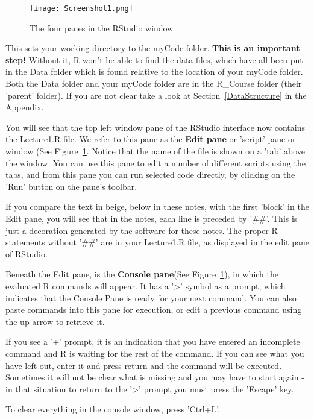 \documentclass[titlepage]{book}
\begin{document}
\begin{figure}[!ht]
\graphicspath{{./Images/}}
\texttt{[image: Screenshot1.png]}
\caption{The four panes in the RStudio window}
\label{fig:Screenshot}
\end{figure}

This sets your working directory to the myCode folder. \textbf{This is an important step!}  Without it, R won't be able to find the data files, which have all been put in the Data folder which is found relative to the location of your myCode folder. Both the Data folder and your myCode folder are in the R\_Course folder (their 'parent' folder). If you are not clear take a look at Section~\ref{DataStructure} in the Appendix.

You will see that the top left window pane of the RStudio interface now contains the Lecture1.R file.   We refer  to this pane as the \textbf{Edit pane} or 'script' pane or window (See Figure~\ref{fig:Screenshot}.  Notice that the name of the file is shown on a 'tab' above the window. You can use this pane to edit a number of different scripts using the tabs, and from this pane you can run selected code directly, by clicking on the 'Run' button on the pane's toolbar.

If you compare the text in beige, below in these notes, with the first 'block' in the Edit pane, you will see that in the notes, each line is preceded by '\#\#'. This is just a decoration generated by the software for these notes. The proper R statements without '\#\#' are in your Lecture1.R file, as displayed in the edit pane of RStudio.

Beneath the Edit pane, is the \textbf{Console pane}(See Figure~\ref{fig:Screenshot}), in which the evaluated R commands will appear. It has a '>' symbol as a prompt, which indicates that the Console Pane is ready for your next command.  You can also paste commands into this pane for execution, or edit a previous command using the up-arrow to retrieve it. 

If you see a '+' prompt, it is an indication that you have entered an incomplete command and R is waiting for the rest of the command. If you can see what you have left out, enter it and press return and the command will be executed.  Sometimes it will not be clear what is missing and you may have to start again -  in that situation to return to the '>' prompt you must press the 'Escape' key.  

To clear everything in the console window, press 'Ctrl+L'.
\end{document}
